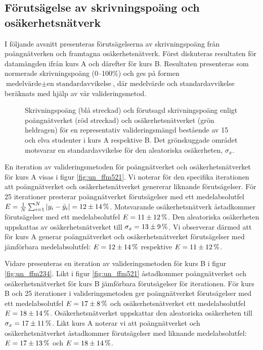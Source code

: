 \subsection{Förutsägelse av skrivningspoäng och osäkerhetsnätverk}
\label{sec:uncert}
I följande avsnitt presenteras förutsägelserna av skrivningspoäng från poängnätverken och framtagna osäkerhetsnätverk. Först diskuteras resultaten för datamängden ifrån kurs A och därefter för kurs B. Resultaten presenteras som normerade skrivningspoäng (0--100\%) och ges på formen $\text{medelvärde} \pm \text{en standardavvikelse}$, där medelvärde och standardavvikelse beräknats med hjälp av vår valideringsmetod.

\begin{figure}[hbtp]
    \centering
    \subfloat[Kurs A]{%
        \resizebox {0.46\textwidth}{!}{%
            
        }
        \label{fig:un_ffm521}
    }
    \hfill
    \subfloat[Kurs B]{%
        \resizebox {0.49\textwidth}{!}{%
            
        }
        \label{fig:un_ffm234}
    }
    \caption{Skrivningspoäng (blå streckad) och förutsagd skrivningspoäng enligt poängnätverket (röd streckad) och osäkerhetsnätverket (grön heldragen) för en representativ valideringsmängd bestående av 15 och elva studenter i kurs A respektive B. Det grönskuggade området motsvarar en standardavvikelse för den aleatoriska osäkerheten, $\sigma_x$.}
    \label{fig:exam_score_results}
\end{figure}
En iteration av valideringsmetoden för poängnätverket och osäkerhetsnätverket för kurs A visas i figur \ref{fig:un_ffm521}. Vi noterar för den specifika iterationen att poängnätverket och osäkerhetsnätverket genererar liknande förutsägelser. För 25 iterationer presterar poängnätverket förutsägelser med ett medelabsolutfel $E = \frac{1}{N}\sum_{i=1}^N \left|y_i - \hat{y}_i\right| = 12 \pm 14\,\rm \%$. Motsvarande osäkerhetsnätverk åstadkommer förutsägelser med ett medelabsolutfel $E = 11 \pm 12\,\rm \%$. Den aleatoriska osäkerheten uppskattas av osäkerhetsnätverket till $\sigma_x = 13 \pm 9\,\rm \%$. Vi observerar därmed att för kurs A generar poängnätverket och osäkerhetsnätverket förutsägelser med jämförbara medelabsolutfel: $E = 12 \pm 14\,\rm \%$ respektive $E = 11 \pm 12\,\rm \%$.

Vidare presenteras en iteration av valideringsmetoden för kurs B i figur \ref{fig:un_ffm234}. Likt i figur \ref{fig:un_ffm521} åstadkommer poängnätverket och osäkerhetsnätverket för kurs B jämförbara förutsägelser för iterationen. För kurs B och 25 iterationer i valideringsmetoden ger poängnätverket förutsägelser med ett medelabsolutfel $E = 17 \pm 8\,\rm \%$ och osäkerhetsnätverket ett medelabsolutfel $E = 18 \pm 14\,\rm \%$. Osäkerhetsnätverket uppskattar den aleatoriska osäkerheten till $\sigma_x = 17 \pm 11\,\rm \%$. Likt kurs A noterar vi att poängnätverket och osäkerhetsnätverket åstadkommer förutsägelser med liknande medelabsolutfel: $E = 17 \pm 13\,\rm \%$ och $E = 18 \pm 14\,\rm \%$.

